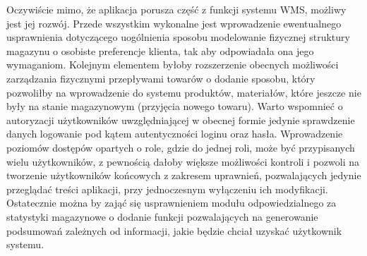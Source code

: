	Oczywiście mimo, że aplikacja porusza część z funkcji systemu WMS, możliwy jest jej rozwój. Przede wszystkim
	wykonalne jest wprowadzenie ewentualnego usprawnienia dotyczącego uogólnienia sposobu modelowanie fizycznej 
	struktury magazynu o osobiste prefe\-rencje klienta, tak aby odpowiadała ona jego wymaganiom. 
	Kolejnym elementem byłoby rozszerzenie obecnych	możliwości zarządzania fizycznymi przepływami towarów o dodanie sposobu, który pozwoliłby
	na wprowadzenie do systemu produktów, materiałów, które jeszcze nie były na stanie magazynowym (przyjęcia nowego towaru).
	Warto wspomnieć o autoryzacji użytkowników uwzględniającej w obecnej formie jedynie sprawdzenie danych
	logowanie pod kątem autentyczności loginu oraz hasła. Wprowadzenie poziomów dostępów opartych o role,
	gdzie do jednej roli, może być przypisanych wielu użytkowników, z pewnością
	dałoby większe możliwości kontroli i pozwoli na tworzenie użytkowników końcowych z zakresem uprawnień,
	pozwalających jedynie przeglądać treści aplikacji, przy jednoczesnym wyłączeniu ich modyfikacji.
	Ostatecznie można by zająć się usprawnieniem modułu odpowiedzialnego za statystyki magazynowe o dodanie funkcji pozwalających
	na generowanie podsumowań zależnych od informacji, jakie będzie chciał uzyskać użytkownik systemu. 